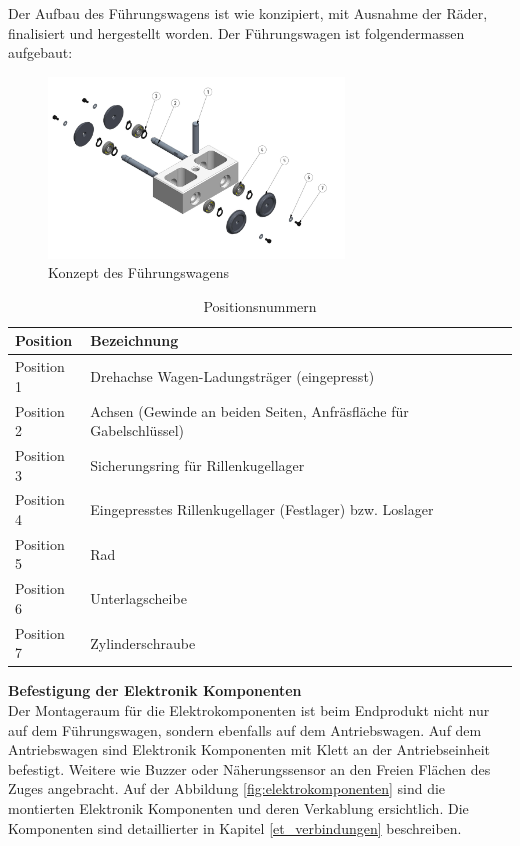 \documentclass[../../main.tex]{subfiles}
\begin{document}
Der Aufbau des Führungswagens ist wie konzipiert, mit Ausnahme der Räder, finalisiert und hergestellt worden. Der Führungswagen ist folgendermassen aufgebaut:\\

\begin{figure}[H]
  \centering
  \includegraphics[width=0.7\textwidth]{fuehrungswagen.PNG}
  \caption {Konzept des Führungswagens}
  \label{fig:fuehrungswagen2}
\end{figure}

\begin{table}[H] \centering
  \begin{tabular}{|l|l|}
  \hline
  \textbf{Position} & \textbf{Bezeichnung}\\
  \hline
  Position 1          & Drehachse Wagen-Ladungsträger (eingepresst)\\
   \hline
  Position 2          & Achsen (Gewinde an beiden Seiten, Anfräsfläche für Gabelschlüssel)\\
   \hline
  Position 3          & Sicherungsring für Rillenkugellager\\
  \hline
  Position 4          & Eingepresstes Rillenkugellager (Festlager) bzw. Loslager\\
  \hline
  Position 5          & Rad\\
  \hline
  Position 6          & Unterlagscheibe\\
  \hline
  Position 7          & Zylinderschraube\\
  \hline
  \end{tabular}
\caption{Positionsnummern}
\label{tab:expl_antriebswagen}
\end{table} 

\pagebreak

\textbf{Befestigung der Elektronik Komponenten}\\
Der Montageraum für die Elektrokomponenten ist beim Endprodukt nicht nur auf dem Führungswagen, sondern ebenfalls auf dem Antriebswagen. Auf dem Antriebswagen sind Elektronik Komponenten mit Klett an der Antriebseinheit befestigt. Weitere wie Buzzer oder Näherungssensor an den Freien Flächen des Zuges angebracht. Auf der Abbildung \ref{fig:elektrokomponenten} sind die montierten Elektronik Komponenten und deren Verkablung ersichtlich. Die Komponenten sind detaillierter in Kapitel \ref{et_verbindungen} beschreiben.\\
\end{document}
